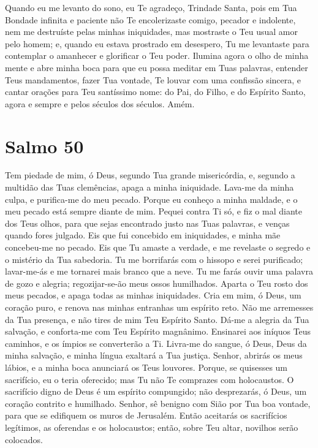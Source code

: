 \documentclass{subfiles}
\begin{document}
\mercy{} 



Quando eu me levanto do sono, eu Te agradeço, Trindade Santa, pois em 
Tua Bondade infinita e paciente não Te encolerizaste comigo, pecador e 
indolente, nem me destruíste pelas minhas iniquidades, mas mostraste o Teu 
usual amor pelo homem; e, quando eu estava prostrado em desespero, Tu me 
levantaste para contemplar o amanhecer e glorificar o Teu poder. Ilumina 
agora o olho de minha mente e abre minha boca para que eu possa meditar 
em Tuas palavras, entender Teus mandamentos, fazer Tua vontade, Te louvar 
com uma confissão sincera, e cantar orações para Teu santíssimo nome: do Pai, 
do Filho, e do Espírito Santo, agora e sempre e pelos séculos dos séculos. 
Amém. 


\section*{Salmo 50}

Tem piedade de mim, ó Deus, segundo Tua grande misericórdia, e, segundo a
multidão das Tuas clemências, apaga a minha iniquidade. Lava-me da minha culpa,
e purifica-me do meu pecado. Porque eu conheço a minha maldade, e o meu pecado
está sempre diante de mim. Pequei contra Ti só, e fiz o mal diante dos Teus
olhos, para que sejas encontrado justo nas Tuas palavras, e venças quando fores
julgado. Eis que fui concebido em iniquidades, e minha mãe concebeu-me no
pecado. Eis que Tu amaste a verdade, e me revelaste o segredo e o mistério da
Tua sabedoria. Tu me borrifarás com o hissopo e serei purificado; lavar-me-ás e
me tornarei mais branco que a neve. Tu me farás ouvir uma palavra de gozo e
alegria; regozijar-se-ão meus ossos humilhados. Aparta o Teu rosto dos meus
pecados, e apaga todas as minhas iniquidades. Cria em mim, ó Deus, um coração
puro, e renova nas minhas entranhas um espírito reto. Não me arremesses da Tua
presença, e não tires de mim Teu Espírito Santo. Dá-me a alegria da Tua
salvação, e conforta-me com Teu Espírito magnânimo. Ensinarei aos iníquos Teus
caminhos, e os ímpios se converterão a Ti. Livra-me do sangue, ó Deus, Deus da
minha salvação, e minha língua exaltará a Tua justiça. Senhor, abrirás os meus
lábios, e a minha boca anunciará os Teus louvores. Porque, se quisesses um
sacrifício, eu o teria oferecido; mas Tu não Te comprazes com holocaustos. O
sacrifício digno de Deus é um espírito compungido; não desprezarás, ó Deus, um
coração contrito e humilhado. Senhor, sê benigno com Sião por Tua boa vontade,
para que se edifiquem os muros de Jerusalém. Então aceitarás os sacrifícios
legítimos, as oferendas e os holocaustos; então, sobre Teu altar, novilhos serão
colocados.
\end{document}
